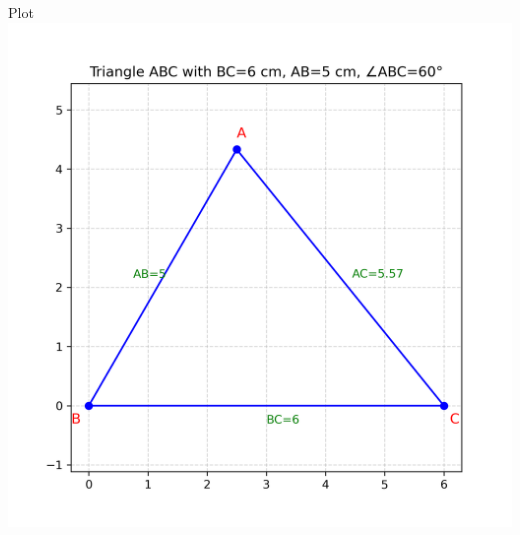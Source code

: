 \documentclass{beamer}
\begin{document}
\begin{frame}{Plot}
    \centering
    \includegraphics[width=\columnwidth, height=0.8\textheight, keepaspectratio]{figs/triangle_solution.png}     
\end{frame}
\end{document}
